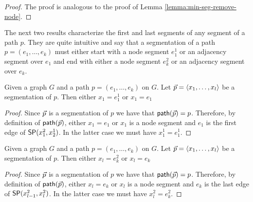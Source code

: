 \begin{proof}
The proof is analogous to the proof of Lemma \ref{lemma:min-seg-remove-node}. 
\end{proof}

The next two results characterize the first and last segments of any segment of a path $p$. They are quite intuitive and say that 
a segmentation of a path $p = (e_1, \ldots, e_k)$ must either start with a node segment $e^1_1$ or an adjacency segment over $e_1$ and end 
with either a node segment $e^2_k$ or an adjacency segment over $e_k$.

\begin{lemma}
\label{lemma:firstseg}
Given a graph $G$ and a path $p = (e_1, \ldots, e_k)$ on $G$. Let $\sr{p} = \langle x_1, \ldots, x_l \rangle$ be a segmentation of $p$. Then
either $x_1 = e^1_1$ or $x_1 = e_1$
\end{lemma}

\begin{proof}
Since $\sr{p}$ is a segmentation of $p$ we have that $\seq(\sr{p}) = p$. Therefore, by definition of $\seq(\sr{p})$, either $x_1 = e_1$ or $x_1$ is a node segment and
$e_1$ is the first edge of $\sp(x^2_1, x^1_2)$. In the latter case we must have $x^1_1 = e^1_1$.
\end{proof}

\begin{lemma}
\label{lemma:lastseg}
Given a graph $G$ and a path $p = (e_1, \ldots, e_k)$ on $G$. Let $\sr{p} = \langle x_1, \ldots, x_l \rangle$ be a segmentation of $p$. Then
either $x_l = e^2_k$ or $x_l = e_k$
\end{lemma}

\begin{proof}
Since $\sr{p}$ is a segmentation of $p$ we have that $\seq(\sr{p}) = p$. Therefore, by definition of $\seq(\sr{p})$, either $x_l = e_k$ or $x_l$ is a node segment and
$e_k$ is the last edge of $\sp(x^2_{l - 1}, x^2_l)$. In the latter case we must have $x^2_l = e^2_k$.
\end{proof}

